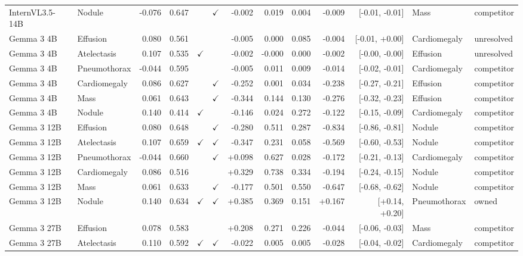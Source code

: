 \begin{longtable}{llrrccrrrrrll}
InternVL3.5-14B & Nodule & -0.076 & 0.647 &  & $\checkmark$ & -0.002 & 0.019 & 0.004 & -0.009 & [-0.01, -0.01] & Mass & competitor \\
Gemma 3 4B & Effusion & 0.080 & 0.561 &  &  & -0.005 & 0.000 & 0.085 & -0.004 & [-0.01, +0.00] & Cardiomegaly & unresolved \\
Gemma 3 4B & Atelectasis & 0.107 & 0.535 & $\checkmark$ &  & -0.002 & -0.000 & 0.000 & -0.002 & [-0.00, -0.00] & Effusion & unresolved \\
Gemma 3 4B & Pneumothorax & -0.044 & 0.595 &  &  & -0.005 & 0.011 & 0.009 & -0.014 & [-0.02, -0.01] & Cardiomegaly & competitor \\
Gemma 3 4B & Cardiomegaly & 0.086 & 0.627 &  & $\checkmark$ & -0.252 & 0.001 & 0.034 & -0.238 & [-0.27, -0.21] & Effusion & competitor \\
Gemma 3 4B & Mass & 0.061 & 0.643 &  & $\checkmark$ & -0.344 & 0.144 & 0.130 & -0.276 & [-0.32, -0.23] & Effusion & competitor \\
Gemma 3 4B & Nodule & 0.140 & 0.414 & $\checkmark$ &  & -0.146 & 0.024 & 0.272 & -0.122 & [-0.15, -0.09] & Cardiomegaly & competitor \\
Gemma 3 12B & Effusion & 0.080 & 0.648 &  & $\checkmark$ & -0.280 & 0.511 & 0.287 & -0.834 & [-0.86, -0.81] & Nodule & competitor \\
Gemma 3 12B & Atelectasis & 0.107 & 0.659 & $\checkmark$ & $\checkmark$ & -0.347 & 0.231 & 0.058 & -0.569 & [-0.60, -0.53] & Nodule & competitor \\
Gemma 3 12B & Pneumothorax & -0.044 & 0.660 &  & $\checkmark$ & +0.098 & 0.627 & 0.028 & -0.172 & [-0.21, -0.13] & Cardiomegaly & competitor \\
Gemma 3 12B & Cardiomegaly & 0.086 & 0.516 &  &  & +0.329 & 0.738 & 0.334 & -0.194 & [-0.24, -0.15] & Nodule & competitor \\
Gemma 3 12B & Mass & 0.061 & 0.633 &  & $\checkmark$ & -0.177 & 0.501 & 0.550 & -0.647 & [-0.68, -0.62] & Nodule & competitor \\
\rowcolor{cfSlate2}Gemma 3 12B & Nodule & 0.140 & 0.634 & $\checkmark$ & $\checkmark$ & +0.385 & 0.369 & 0.151 & +0.167 & [+0.14, +0.20] & Pneumothorax & owned \\
Gemma 3 27B & Effusion & 0.078 & 0.583 &  &  & +0.208 & 0.271 & 0.226 & -0.044 & [-0.06, -0.03] & Mass & competitor \\
Gemma 3 27B & Atelectasis & 0.110 & 0.592 & $\checkmark$ & $\checkmark$ & -0.022 & 0.005 & 0.005 & -0.028 & [-0.04, -0.02] & Cardiomegaly & competitor \\

\end{longtable}
